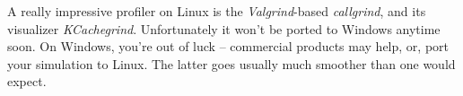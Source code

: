 A really impressive profiler on Linux is the \textit{Valgrind}-based
\textit{callgrind}, and its visualizer \textit{KCachegrind}.
Unfortunately it won't be ported to Windows anytime soon.
On Windows, you're out of luck -- commercial products may help, or,
port your simulation to Linux. The latter goes usually much smoother
than one would expect.


%
%
%


